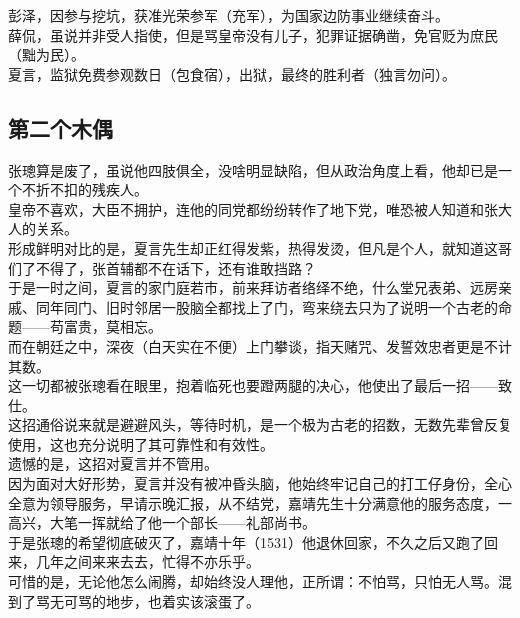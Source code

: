 \begin{multicols}{\theparacolNo}
彭泽，因参与挖坑，获准光荣参军（充军），为国家边防事业继续奋斗。\\

薛侃，虽说并非受人指使，但是骂皇帝没有儿子，犯罪证据确凿，免官贬为庶民（黜为民）。\\

夏言，监狱免费参观数日（包食宿），出狱，最终的胜利者（独言勿问）。\\

\subsection{第二个木偶}
张璁算是废了，虽说他四肢俱全，没啥明显缺陷，但从政治角度上看，他却已是一个不折不扣的残疾人。\\

皇帝不喜欢，大臣不拥护，连他的同党都纷纷转作了地下党，唯恐被人知道和张大人的关系。\\

形成鲜明对比的是，夏言先生却正红得发紫，热得发烫，但凡是个人，就知道这哥们了不得了，张首辅都不在话下，还有谁敢挡路？\\

于是一时之间，夏言的家门庭若市，前来拜访者络绎不绝，什么堂兄表弟、远房亲戚、同年同门、旧时邻居一股脑全都找上了门，弯来绕去只为了说明一个古老的命题——苟富贵，莫相忘。\\

而在朝廷之中，深夜（白天实在不便）上门攀谈，指天赌咒、发誓效忠者更是不计其数。\\

这一切都被张璁看在眼里，抱着临死也要蹬两腿的决心，他使出了最后一招——致仕。\\

这招通俗说来就是避避风头，等待时机，是一个极为古老的招数，无数先辈曾反复使用，这也充分说明了其可靠性和有效性。\\

遗憾的是，这招对夏言并不管用。\\

因为面对大好形势，夏言并没有被冲昏头脑，他始终牢记自己的打工仔身份，全心全意为领导服务，早请示晚汇报，从不结党，嘉靖先生十分满意他的服务态度，一高兴，大笔一挥就给了他一个部长——礼部尚书。\\

于是张璁的希望彻底破灭了，嘉靖十年（1531）他退休回家，不久之后又跑了回来，几年之间来来去去，忙得不亦乐乎。\\

可惜的是，无论他怎么闹腾，却始终没人理他，正所谓：不怕骂，只怕无人骂。混到了骂无可骂的地步，也着实该滚蛋了。\\


\end{multicols}
